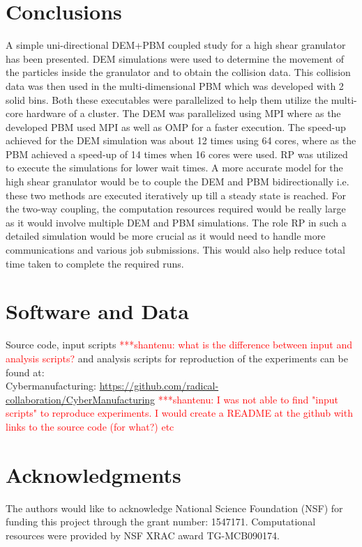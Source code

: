 \documentclass[preprint,11pt,authoryear]{elsarticle}
\newcommand{\jhanote}[1]{ {\textcolor{red} { ***shantenu: #1 }}}
\newcommand{\jhanote}[1]{ {\textcolor{red} { ***shantenu: #1 }}}
\begin{document}
\section{Conclusions}
A simple uni-directional DEM+PBM coupled study for a high shear granulator has been 
presented. DEM simulations were used to determine the movement of the particles inside 
the granulator and to obtain the collision data. This collision data was then used in 
the multi-dimensional PBM which was developed with 2 solid bins. Both these executables 
were parallelized to help them utilize the multi-core hardware of a cluster. The DEM 
was parallelized using MPI where as the developed PBM used MPI as well as OMP for a 
faster execution. The speed-up achieved for the DEM simulation was about 12 times using 
64 cores, where as the PBM achieved a speed-up of 14 times when 16 cores were used. 
RP was utilized to execute the simulations for lower wait times. A more accurate 
model for the high shear granulator would be to couple the DEM and PBM bidirectionally 
i.e. these two methods are executed iteratively up till a steady state is reached. 
For the two-way coupling, the computation resources required would be really large 
as it would involve multiple DEM and PBM simulations. The role RP in such a 
detailed simulation would be more crucial as it would need to handle more 
communications and various job submissions. This would also help reduce 
total time taken to complete the required runs.

\section*{Software and Data}
\noindent Source code, input scripts \jhanote{what is the difference between input and analysis scripts?} and analysis scripts for reproduction of the experiments can be found at:\\
Cybermanufacturing: \url{https://github.com/radical-collaboration/CyberManufacturing}
\jhanote{I was not able to find "input scripts" to reproduce experiments. I
would create a README at the github with links to the source code (for what?)
etc}


\section*{Acknowledgments}
\noindent The authors would like to acknowledge National Science Foundation (NSF) for 
funding this project through the grant number: 1547171. Computational resources 
were provided by NSF XRAC award TG-MCB090174.
\end{document}
